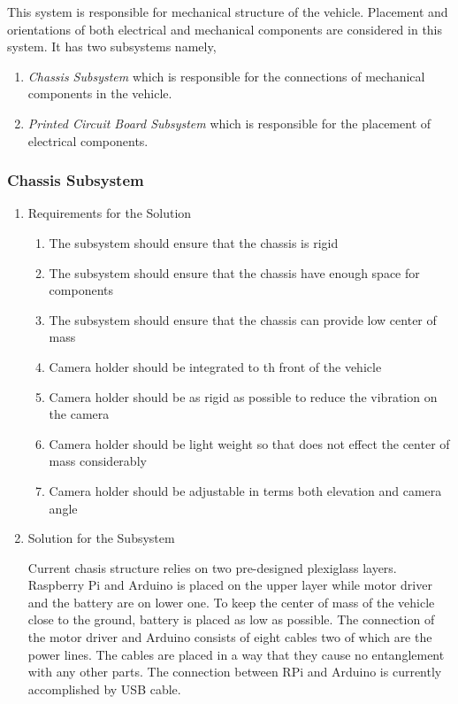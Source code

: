 \documentclass[a4paper,12pt]{article}
\begin{document}
\begin{enumerate}
\begin{enumerate}
		\end{enumerate}	
		
		
		
		This system is responsible for mechanical structure of the vehicle. Placement and orientations of both electrical and mechanical components are considered in this system. It has two subsystems namely,
		
		\begin{enumerate}
			\item \textit{Chassis Subsystem} which is responsible for the connections of mechanical components in the vehicle.
			\item \textit{Printed Circuit Board Subsystem} which is responsible for the placement of electrical components.
		\end{enumerate}
		

	\subsubsection{Chassis Subsystem}
	
		\begin{enumerate}
			\item {Requirements for the Solution}
			
			\begin{enumerate}
					\item The subsystem should ensure that the chassis is rigid 
					\item The subsystem should ensure that the chassis have enough space for components
					\item The subsystem should ensure that the chassis can provide low center of mass 
					\item Camera holder should be integrated to th front of the vehicle
	 				\item Camera holder should be as rigid as possible to reduce the vibration on the camera
	 				\item Camera holder should be light weight so that does not effect the center of mass considerably
	 				\item Camera holder should be adjustable in terms both elevation and camera angle
	
				\end{enumerate}
				
			\item {Solution for the Subsystem}
			
			Current chasis structure relies on two pre-designed plexiglass layers. Raspberry Pi and Arduino is placed on the upper layer while motor driver and the battery are on lower one. To keep the center of mass of the vehicle close to the ground, battery is placed as low as possible. The connection of the motor driver and Arduino consists of eight cables two of which are the power lines. The cables are placed in a way that they cause no entanglement with any other parts. The connection between RPi and Arduino is currently accomplished by USB cable. \\
	

\end{enumerate}
\end{enumerate}
\end{document}
